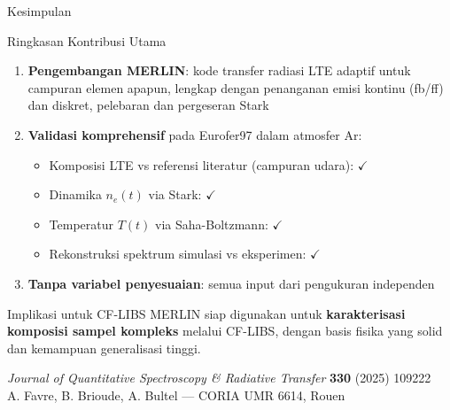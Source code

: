 \documentclass[aspectratio=169, 10pt]{beamer}
\begin{document}
\begin{frame}{Kesimpulan}
  \begin{block}{Ringkasan Kontribusi Utama}
    \begin{enumerate}
      \item \textbf{Pengembangan MERLIN}: kode transfer radiasi LTE adaptif untuk campuran elemen apapun, lengkap dengan penanganan emisi kontinu (fb/ff) dan diskret, pelebaran dan pergeseran Stark
      \item \textbf{Validasi komprehensif} pada Eurofer97 dalam atmosfer Ar:
            \begin{itemize}
              \item Komposisi LTE vs referensi literatur (campuran udara): $\checkmark$
              \item Dinamika $n_e(t)$ via Stark: $\checkmark$
              \item Temperatur $T(t)$ via Saha-Boltzmann: $\checkmark$
              \item Rekonstruksi spektrum simulasi vs eksperimen: $\checkmark$
            \end{itemize}
      \item \textbf{Tanpa variabel penyesuaian}: semua input dari pengukuran independen
    \end{enumerate}
  \end{block}
  \vspace{4pt}
  \begin{exampleblock}{Implikasi untuk CF-LIBS}
    MERLIN siap digunakan untuk \textbf{karakterisasi komposisi sampel kompleks} melalui CF-LIBS, dengan basis fisika yang solid dan kemampuan generalisasi tinggi.
  \end{exampleblock}
  \begin{flushright}
    \small \textit{Journal of Quantitative Spectroscopy \& Radiative Transfer} \textbf{330} (2025) 109222\\
    A. Favre, B. Brioude, A. Bultel --- CORIA UMR 6614, Rouen
  \end{flushright}
\end{frame}
\end{document}
